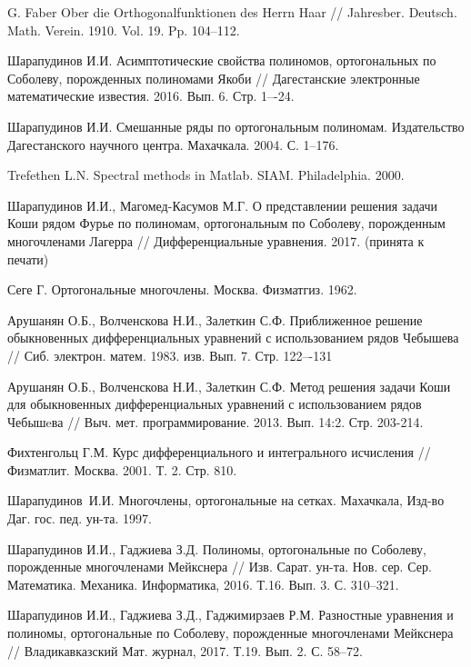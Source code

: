 \begin{thebibliography}{111}
{G. Faber}
Ober die Orthogonalfunktionen des Herrn Haar // Jahresber. Deutsch. Math. Verein. 1910. Vol. 19. Pp. 104--112.


{Шарапудинов И.И.}
Асимптотические свойства полиномов, ортогональных по Соболеву, порожденных полиномами Якоби // Дагестанские электронные математические известия. 2016. Вып. 6.	Стр. 1–-24.


{Шарапудинов И.И.}
Смешанные ряды по ортогональным полиномам. Издательство Дагестанского научного центра. Махачкала. 2004. С. 1--176.


{Trefethen L.N.}
Spectral methods in Matlab. SIAM. Philadelphia. 2000.


{Шарапудинов И.И., Магомед-Касумов М.Г.}
О представлении решения задачи Коши  рядом Фурье  по полиномам, ортогональным по  Соболеву, порожденным многочленами Лагерра // Дифференциальные уравнения. 2017. (принята к печати)








Сеге Г. Ортогональные многочлены. Москва. Физматгиз. 1962.


{Арушанян О.Б., Волченскова Н.И., Залеткин С.Ф.}
Приближенное решение обыкновенных дифференциальных уравнений с использованием рядов Чебышева // Сиб. электрон. матем. 1983. изв. Вып. 7. Стр. 122–-131


{Арушанян О.Б., Волченскова Н.И., Залеткин С.Ф.}
 Метод решения задачи Коши для обыкновенных дифференциальных уравнений с использованием рядов Чебышeва // Выч. мет. программирование. 2013. Вып. 14:2. Стр. 203-214.


{Фихтенгольц Г.М.}
Курс дифференциального и интегрального исчисления // Физматлит. Москва. 2001. Т. 2. Стр. 810.


{Шарапудинов~И.И.} Многочлены, ортогональные на сетках. Махачкала, Изд-во Даг. гос. пед. ун-та. 1997.		


{Шарапудинов И.И., Гаджиева З.Д.}
Полиномы, ортогональные по Соболеву, порожденные многочленами Мейкснера // Изв. Сарат. ун-та. Нов. сер. Сер. Математика. Механика. Информатика,
2016. Т.16. Вып. 3. С. 310--321.


{Шарапудинов И.И., Гаджиева З.Д., Гаджимирзаев Р.М.}
Разностные уравнения и полиномы, ортогональные по Соболеву, порожденные многочленами Мейкснера //
Владикавказский Мат. журнал, 2017. Т.19. Вып. 2. С. 58--72.



\end{thebibliography}
